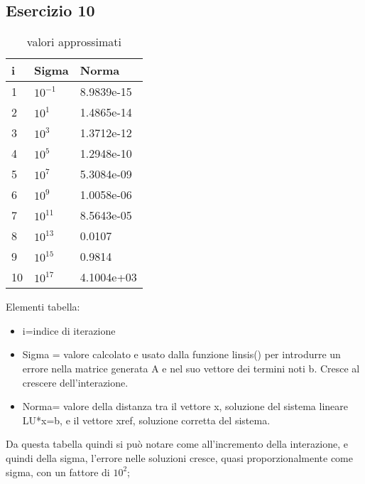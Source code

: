 \subsection{Esercizio 10}

\begin{table}[h]
\begin{tabular}{|l l l|}
        \hline
        i & Sigma  &  Norma\\
        \hline
        1 & $10^{-1}$  &  8.9839e-15\\
        2 & $10^{1}$ &  1.4865e-14 \\
        3 & $10^{3}$ &  1.3712e-12 \\
        4 & $10^{5}$ &  1.2948e-10 \\
        5 & $10^{7}$ &  5.3084e-09 \\
        6 & $10^{9}$ &  1.0058e-06 \\
        7 & $10^{11}$ &  8.5643e-05 \\
        8 & $10^{13}$ &  0.0107 \\
        9 & $10^{15}$ &  0.9814 \\
        10 & $10^{17}$ & 4.1004e+03\\
        \hline
\end{tabular}
\caption{valori approssimati}
\label{tab::1}     
\end{table}
Elementi tabella:
\begin{itemize}
        \item i=indice di iterazione
        \item Sigma = valore calcolato e usato dalla funzione linsis() per introdurre un errore nella matrice generata A e nel suo vettore dei termini noti b. Cresce al crescere dell'interazione.
        \item Norma= valore della distanza tra il vettore x, soluzione del sistema lineare LU*x=b, e il vettore xref, soluzione corretta del sistema.
\end{itemize}	
Da questa tabella quindi si può notare come all'incremento della interazione, e quindi della sigma, l'errore nelle soluzioni  cresce, quasi proporzionalmente come sigma, con un fattore di $10^{2}$;
